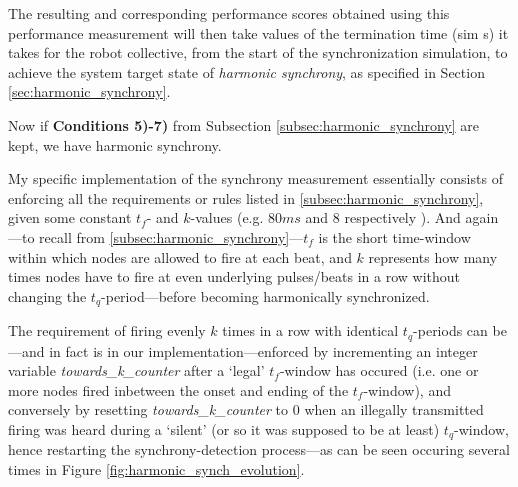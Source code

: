 	The resulting and corresponding performance scores obtained using this performance measurement will then take values of the termination time (sim s) it takes for the robot collective, from the start of the synchronization simulation, to achieve the system target state of \textit{harmonic synchrony}, as specified in Section \ref{sec:harmonic_synchrony}.

	Now if \textbf{Conditions 5)-7)} from Subsection \ref{subsec:harmonic_synchrony} are kept, we have harmonic synchrony.

	My specific implementation of the synchrony measurement essentially consists of enforcing all the requirements or rules listed in \ref{subsec:harmonic_synchrony}, given some constant $t_f$- and $k$-values (e.g. $80ms$ and $8$ respectively \cite{nymoen_synch}). And again—to recall from \ref{subsec:harmonic_synchrony}—$t_f$ is the short time-window within which nodes are allowed to fire at each beat, and $k$ represents how many times nodes have to fire at even underlying pulses/beats in a row without changing the $t_q$-period—before becoming harmonically synchronized.

	The requirement of firing evenly $k$ times in a row with identical $t_q$-periods can be—and in fact is in our implementation—enforced by incrementing an integer variable \textit{towards\_k\_counter} after a `legal' $t_f$-window has occured (i.e. one or more nodes fired inbetween the onset and ending of the $t_f$-window), and conversely by resetting \textit{towards\_k\_counter} to 0 when an illegally transmitted firing was heard during a `silent' (or so it was supposed to be at least) $t_q$-window, hence restarting the synchrony-detection process—as can be seen occuring several times in Figure \ref{fig:harmonic_synch_evolution}.
	
